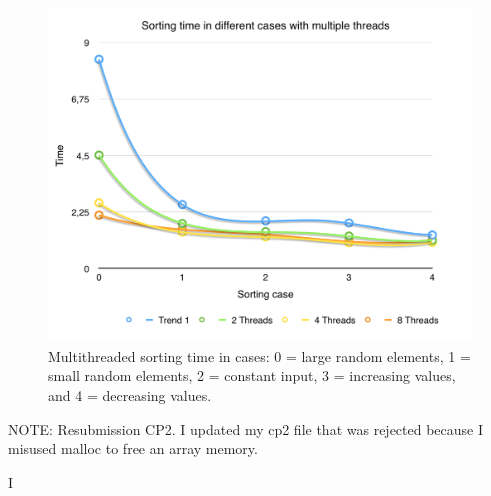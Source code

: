 \documentclass[a4paper,10pt]{article}
\begin{document}
\begin{figure}[H]
\centering
\includegraphics[width=1\textwidth]{figures/w3_SortingTime}
\caption{Multithreaded sorting time in cases:  0 = large random elements, 1 = small random elements, 2 = constant input, 3 = increasing values, and 4 = decreasing values.}
\label{fig:pca_type}
\end{figure}

NOTE: Resubmission CP2. I updated my cp2 file that was rejected because I misused malloc to free an array memory. 


I
\end{document}
